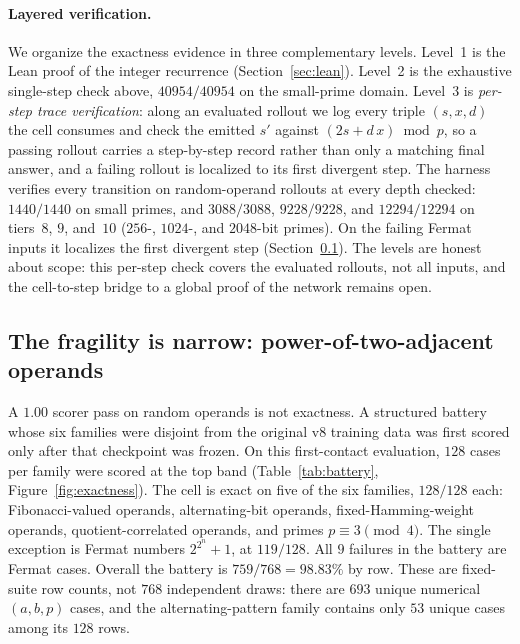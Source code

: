 \documentclass[11pt]{article}
\begin{document}
\paragraph{Layered verification.}
We organize the exactness evidence in three complementary levels. Level~1
is the Lean proof of the integer recurrence (Section~\ref{sec:lean}). Level~2 is the
exhaustive single-step check above, $40954/40954$ on the small-prime domain. Level~3
is \emph{per-step trace verification}: along an evaluated rollout we log every triple
$(s,x,d)$ the cell consumes and check the emitted $s'$ against $(2s + d\,x)\bmod p$,
so a passing rollout carries a step-by-step record rather than only a matching
final answer, and a failing rollout is localized to its first divergent step. The harness verifies
every transition on random-operand rollouts at every depth checked: $1440/1440$ on
small primes, and $3088/3088$, $9228/9228$, and $12294/12294$ on tiers~$8$, $9$,
and~$10$ ($256$-, $1024$-, and $2048$-bit primes). On the failing Fermat inputs it
localizes the first divergent step (Section~\ref{sec:results:battery}). The levels are honest about
scope: this per-step check covers the evaluated rollouts, not all inputs, and the
cell-to-step bridge to a global proof of the network remains open.

\subsection{The fragility is narrow: power-of-two-adjacent operands}
\label{sec:results:battery}

A $1.00$ scorer pass on random operands is not exactness. A structured battery
whose six families were disjoint from the original v8 training data was first
scored only after that checkpoint was frozen. On this first-contact evaluation,
$128$ cases per family were scored at the top band (Table~\ref{tab:battery},
Figure~\ref{fig:exactness}). The cell is exact
on five of the six families, $128/128$ each: Fibonacci-valued operands,
alternating-bit operands, fixed-Hamming-weight operands, quotient-correlated
operands, and primes $p \equiv 3 \pmod 4$. The
single exception is Fermat numbers $2^{2^n}+1$, at $119/128$. All $9$ failures in
the battery are Fermat cases. Overall the battery is $759/768 = 98.83\%$ by row.
These are fixed-suite row counts, not $768$ independent draws: there are $693$
unique numerical $(a,b,p)$ cases, and the alternating-pattern family contains
only $53$ unique cases among its $128$ rows.
\end{document}

